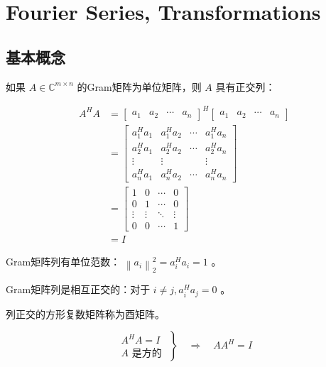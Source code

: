 \chapter{Fourier Series, Transformations}

\section{基本概念}

\begin{definition}[复数域的Gram矩阵]
    如果 $ A \in \mathbb{C}^{m \times n} $ 的Gram矩阵为单位矩阵，则 $ A $ 具有正交列：

$$
\begin{aligned}
A^{H} A&=\left[\begin{array}{lllll}
a_{1} & a_{2} & \cdots & a_{n}
\end{array}\right]^{H}\left[\begin{array}{lccc}
a_{1} & a_{2} & \cdots & a_{n}
\end{array}\right] \\
&=\left[\begin{array}{cccc}
a_{1}^{H} a_{1} & a_{1}^{H} a_{2} & \cdots & a_{1}^{H} a_{n} \\
a_{2}^{H} a_{1} & a_{2}^{H} a_{2} & \cdots & a_{2}^{H} a_{n} \\
\vdots & \vdots & & \vdots \\
a_{n}^{H} a_{1} & a_{n}^{H} a_{2} & \cdots & a_{n}^{H} a_{n}
\end{array}\right] \\
&=\left[\begin{array}{cccc}
1 & 0 & \cdots & 0 \\
0 & 1 & \cdots & 0 \\
\vdots & \vdots & \ddots & \vdots \\
0 & 0 & \cdots & 1
\end{array}\right]
\\ &=I
\end{aligned}
$$
\end{definition}

Gram矩阵列有单位范数： $ \left\|a_{i}\right\|_{2}^{2}=a_{i}^{H} a_{i}=1 $ 。

Gram矩阵列是相互正交的：对于 $ i \neq j, a_{i}^{H} a_{j}=0 $ 。

\begin{definition}[酉矩阵]
    列正交的方形复数矩阵称为酉矩阵。
\end{definition}

\begin{definition}[酉矩阵的逆]
    $$ \left.\begin{array}{c}A^{H} A=I \\ A \text { 是方的 }\end{array}\right\} \quad \Rightarrow \quad A A^{H}=I $$
\end{definition}


